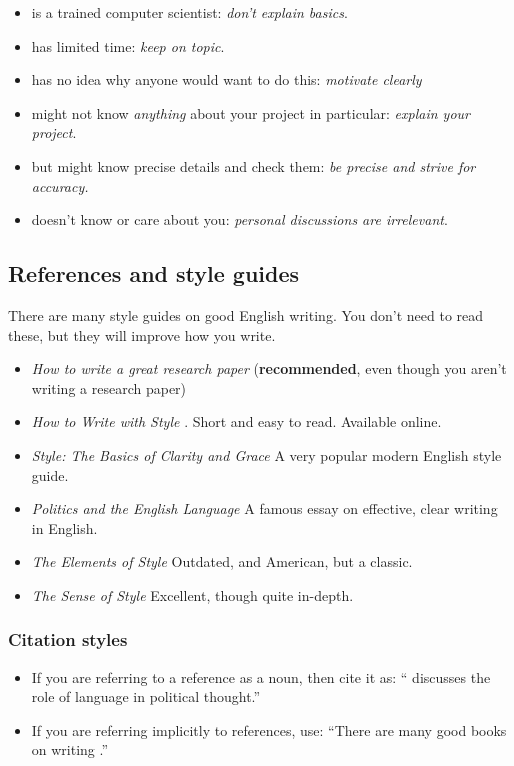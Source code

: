 \documentclass{l4proj}
\begin{document}
\begin{itemize}
    \item
    is a trained computer scientist: \emph{don't explain basics}.
    \item
    has limited time: \emph{keep on topic}.
    \item
    has no idea why anyone would want to do this: \emph{motivate clearly}
    \item
    might not know \emph{anything} about your project in particular:
    \emph{explain your project}.
    \item
    but might know precise details and check them: \emph{be precise and
    strive for accuracy.}
    \item
    doesn't know or care about you: \emph{personal discussions are
    irrelevant}.
\end{itemize}

\subsection{References and style guides}
There are many style guides on good English writing. You don't need to
read these, but they will improve how you write.

\begin{itemize}
    \item
    \emph{How to write a great research paper} \cite{Pey17} (\textbf{recommended}, even though you aren't writing a research paper)
    \item
    \emph{How to Write with Style} \cite{Von80}. Short and easy to read. Available online.
    \item
    \emph{Style: The Basics of Clarity and Grace} \cite{Wil09} A very popular modern English style guide.
    \item
    \emph{Politics and the English Language} \cite{Orw68}  A famous essay on effective, clear writing in English.
    \item
    \emph{The Elements of Style} \cite{StrWhi07} Outdated, and American, but a classic.
    \item
    \emph{The Sense of Style} \cite{Pin15} Excellent, though quite in-depth.
\end{itemize}

\subsubsection{Citation styles}

\begin{itemize}
\item If you are referring to a reference as a noun, then cite it as: ``\citet{Orw68} discusses the role of language in political thought.''
\item If you are referring implicitly to references, use: ``There are many good books on writing \citep{Orw68, Wil09, Pin15}.''
\end{itemize}
\end{document}
